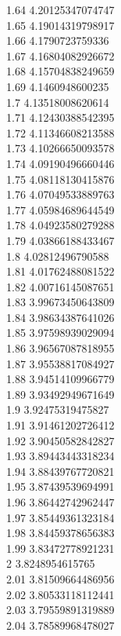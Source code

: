 {1.64	4.20125347074747\\
1.65	4.19014319798917\\
1.66	4.1790723759336\\
1.67	4.16804082926672\\
1.68	4.15704838249659\\
1.69	4.1460948600235\\
1.7	4.13518008620614\\
1.71	4.12430388542395\\
1.72	4.11346608213588\\
1.73	4.10266650093578\\
1.74	4.09190496660446\\
1.75	4.08118130415876\\
1.76	4.07049533889763\\
1.77	4.05984689644549\\
1.78	4.04923580279288\\
1.79	4.03866188433467\\
1.8	4.02812496790588\\
1.81	4.01762488081522\\
1.82	4.00716145087651\\
1.83	3.99673450643809\\
1.84	3.98634387641026\\
1.85	3.97598939029094\\
1.86	3.96567087818955\\
1.87	3.95538817084927\\
1.88	3.94514109966779\\
1.89	3.93492949671649\\
1.9	3.92475319475827\\
1.91	3.91461202726412\\
1.92	3.90450582842827\\
1.93	3.89443443318234\\
1.94	3.88439767720821\\
1.95	3.87439539694991\\
1.96	3.86442742962447\\
1.97	3.85449361323184\\
1.98	3.84459378656383\\
1.99	3.83472778921231\\
2	3.8248954615765\\
2.01	3.81509664486956\\
2.02	3.80533118112441\\
2.03	3.79559891319889\\
2.04	3.78589968478027\\
}
